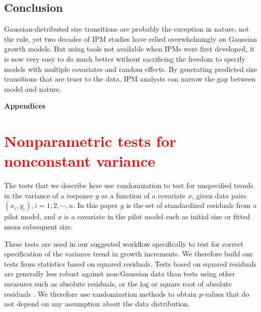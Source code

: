 \documentclass[12pt]{article}
\newcommand{\new}{\textcolor{red}}
\begin{document}
 \subsection*{Conclusion}
Gaussian-distributed size transitions are probably the exception in nature, not the rule, yet two decades of IPM studies have relied overwhelmingly on Gaussian growth models. 
But using tools not available when IPMs were first developed, it is now very easy to do much better without sacrificing the freedom to specify models with multiple covariates and random effects.  
By generating predicted size transitions that are truer to the data, IPM analysts can narrow the gap between model and nature. 

\newpage 



\newpage 
\clearpage 
\setcounter{equation}{0}
\setcounter{figure}{0}
\setcounter{section}{0}
\setcounter{table}{0}
\setcounter{Box}{0}
\renewcommand{\theequation}{S.\arabic{equation}}
\renewcommand{\thetable}{S-\arabic{table}}
\renewcommand{\thefigure}{S-\arabic{figure}}
\renewcommand{\theBox}{S-\arabic{Box}}
\renewcommand{\thesection}{S.\arabic{section}}

\centerline{\Large{\textbf{Appendices}}}

\section{\new{Nonparametric tests for nonconstant variance}}
\label{sec:VarianceTests}  

The tests that we describe here use randomization to test for unspecified trends in the variance of a response $y$ as a 
function of a covariate $x$, given data pairs $(x_i,y_i),  i = 1,2, \cdots, n$. 
In this paper $y$ is the set of standardized residuals from a pilot model, and $x$ is a covariate in the pilot model such as initial size or fitted mean subsequent size. 

These tests are used in our suggested workflow specifically to test for correct specification of the variance trend in growth increments. 
We therefore build our tests from statistics based on squared residuals. Tests based on squared residuals are generally less robust against non-Gaussian data than tests
using other measures such as absolute residuals, or the log or square root of absolute residuals \citep{conover-etal-1981}. 
We therefore use randomization methods to obtain $p$-values that do not depend on any assumption about the data distribution. 
\end{document}

